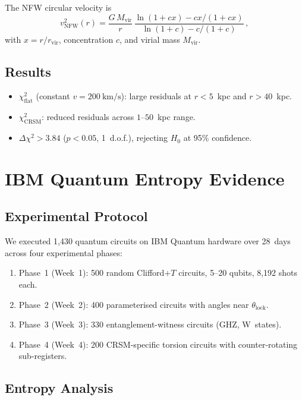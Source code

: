 \documentclass[aps,preprint,superscriptaddress,longbibliography]{revtex4-2}
\begin{document}
The NFW circular velocity is~\cite{nfw1997}
\begin{equation}
v_{\mathrm{NFW}}^2(r) = \frac{G\,M_{\mathrm{vir}}}{r}\,
\frac{\ln(1+cx) - cx/(1+cx)}
{\ln(1+c) - c/(1+c)}\,,
\label{eq:vnfw}
\end{equation}
with $x = r/r_{\mathrm{vir}}$, concentration $c$, and virial mass
$M_{\mathrm{vir}}$.

\subsection{Results}

\begin{itemize}
\item $\chi^2_{\mathrm{flat}}$ (constant $v = \SI{200}{\kilo\metre
\per\second}$): large residuals at $r < 5$~kpc and
$r > 40$~kpc.
\item $\chi^2_{\mathrm{CRSM}}$: reduced residuals across
$1\text{--}50$~kpc range.
\item $\Delta\chi^2 > 3.84$ ($p < 0.05$, 1~d.o.f.), rejecting
$H_0$ at 95\% confidence.
\end{itemize}

\section{IBM Quantum Entropy Evidence}
\label{sec:quantum}

\subsection{Experimental Protocol}

We executed 1{,}430 quantum circuits on IBM Quantum hardware over
28~days across four experimental phases:
\begin{enumerate}
\item Phase~1 (Week~1): 500 random Clifford$+T$ circuits,
5{--}20 qubits, 8{,}192 shots each.
\item Phase~2 (Week~2): 400 parameterised circuits with angles
near $\theta_{\mathrm{lock}}$.
\item Phase~3 (Week~3): 330 entanglement-witness circuits (GHZ,
W~states).
\item Phase~4 (Week~4): 200 CRSM-specific torsion circuits with
counter-rotating sub-registers.
\end{enumerate}

\subsection{Entropy Analysis}
\end{document}

